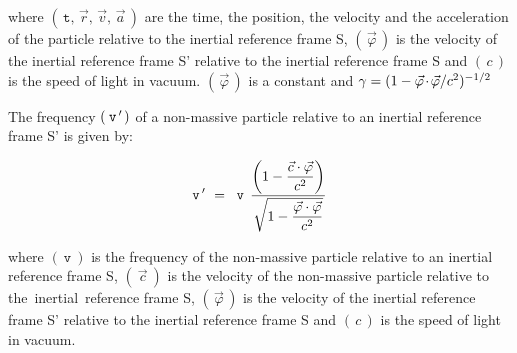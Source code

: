 \documentclass[10pt,fleqn]{article}
\begin{document}
\par \vspace{+1.20em}
\noindent where $( \, \mathtt{t}, \, \vec{r}, \, \vec{v}, \, \vec{a} \, )$ are the time, the position, the velocity and the acceleration of the particle relative to the inertial reference frame S, $( \, \vec{\varphi} \, )$ is the velocity of the inertial reference frame S' relative to the inertial reference frame S and $( \, c \, )$ is the speed of light in vacuum. $( \, \vec{\varphi} \, )$ is a constant and {\small $\gamma = ({1 - \vec{\varphi} \hspace{-0.114em}\cdot\hspace{-0.114em} \vec{\varphi}/c^2})^{-1/2}$}

\vspace{+0.60em}

\par {}

\bigskip \smallskip

\noindent The frequency $(\hspace{+0.24em}\mathtt{v}\hspace{+0.15em}'\hspace{+0.12em})$ of a non-massive particle relative to an inertial reference frame S' is given by:
\par \vspace{-0.60em}
\begin{eqnarray*}
\mathtt{v}\hspace{+0.15em}' ~=~ \: \mathtt{v} \;\, \dfrac{\left ( 1 - \dfrac{\vec{c} \cdot \vec{\varphi}}{c^2} \right )}{\sqrt{1 - \dfrac{\vec{\varphi} \cdot \vec{\varphi}}{c^2}}}
\end{eqnarray*}
\par \vspace{+0.45em}
\noindent where $( \: \mathtt{v} \: )$ is the frequency of the non-massive particle relative to an inertial reference frame S, $( \: \vec{c} \: )$ is the velocity of the non-massive particle relative to \hbox {the inertial reference} frame S, $( \, \vec{\varphi} \, )$ is the velocity of the inertial reference frame S' relative to the inertial reference frame S and $( \, c \, )$ is the speed of light in vacuum.

\newpage

\par {}
\end{document}
